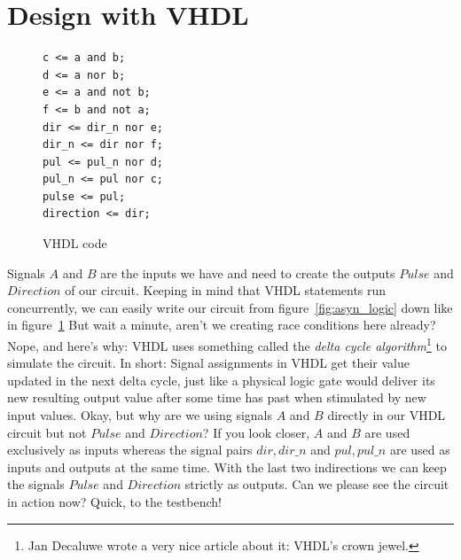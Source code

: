 \documentclass[a4paper]{article}
\begin{document}
\section{Design with VHDL}
\begin{figure}
\centering
\begin{BVerbatim}
c <= a and b;
d <= a nor b;
e <= a and not b;
f <= b and not a;
dir <= dir_n nor e;
dir_n <= dir nor f;
pul <= pul_n nor d;
pul_n <= pul nor c;
pulse <= pul;
direction <= dir;
\end{BVerbatim}
\caption{VHDL code}
\label{fig:asyn_vhdl}
\end{figure}
Signals $A$ and $B$ are the inputs we have and need to create the outputs $Pulse$ and $Direction$ of our circuit.
Keeping in mind that VHDL statements run concurrently, we can easily write our circuit from figure~\ref{fig:asyn_logic} down like in figure~\ref{fig:asyn_vhdl}
But wait a minute, aren't we creating race conditions here already?
Nope, and here's why: VHDL uses something called the \emph{delta cycle algorithm}\footnote{Jan Decaluwe wrote a very nice article about it: VHDL's crown jewel.} to simulate the circuit.
In short: Signal assignments in VHDL get their value updated in the next delta cycle, just like a physical logic gate would deliver its new resulting output value after some time has past when stimulated by new input values.
Okay, but why are we using signals $A$ and $B$ directly in our VHDL circuit but not $Pulse$ and $Direction$?
If you look closer, $A$ and $B$ are used exclusively as inputs whereas the signal pairs $dir,dir\_n$ and $pul,pul\_n$ are used as inputs and outputs at the same time.
With the last two indirections we can keep the signals $Pulse$ and $Direction$ strictly as outputs.
Can we please see the circuit in action now? Quick, to the testbench!
\newpage
\end{document}
